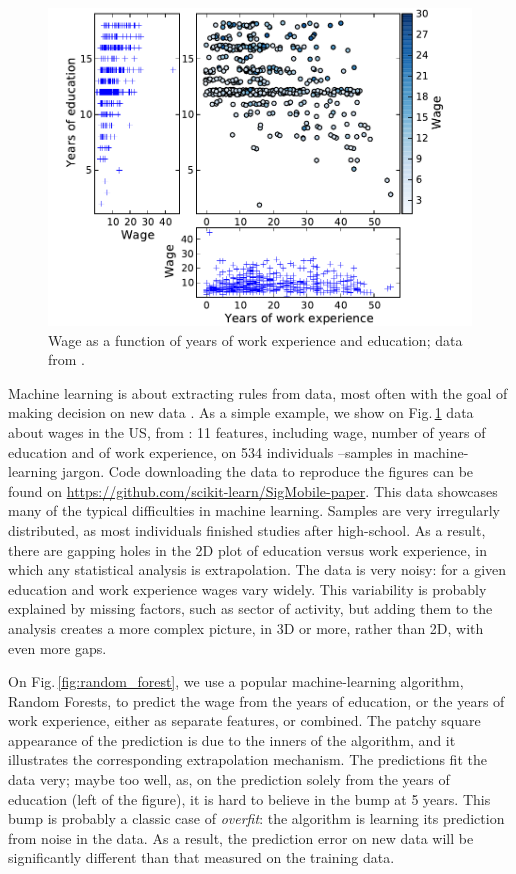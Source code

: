 \documentclass[a4paper]{article}
\begin{document}
\begin{figure}[b]
    \includegraphics[width=1.05\linewidth]{wage_data}%

    \caption{Wage as a function of years of work experience and
    education; data from \cite{berndt1991}\label{fig:data}.}
\end{figure}

Machine learning is about extracting rules from data, most often with the
goal of making decision on new data \cite{elemstatlearn}. As a simple example, we show on
Fig.\,\ref{fig:data} data about wages in the US, from \cite{berndt1991}:
11 features, including wage, number of years of education and of work
experience, on 534 individuals --samples in machine-learning
jargon. 
Code downloading the data to reproduce the figures can be found on
\url{https://github.com/scikit-learn/SigMobile-paper}.
%
This data showcases many of the typical difficulties in machine learning.
Samples are very irregularly distributed, as most individuals
finished studies after high-school. As a result, there are gapping
holes in the 2D plot of education versus work experience, in which any
statistical analysis is extrapolation. The data is very noisy: for a
given education and work experience wages vary widely. This variability
is probably explained by missing factors, such as sector of
activity, but adding them to the analysis creates a more complex picture,
in 3D or more, rather than 2D, with even more gaps.

On Fig.\,\ref{fig:random_forest}, we use a popular machine-learning
algorithm, Random Forests, to predict the wage from the years of
education, or the years of work experience, either as separate features,
or combined. The patchy square appearance of the prediction is due to the
inners of the algorithm, and it illustrates the corresponding
extrapolation mechanism. The predictions fit the data very; maybe too
well, as, on the prediction solely from the years of education (left of
the figure), it is hard to believe in the bump at 5 years. This bump is
probably a classic case of \emph{overfit}: the algorithm is learning its
prediction from noise in the data. As a result, the prediction error on
new data will be significantly different than that measured on the
training data.
\end{document}
